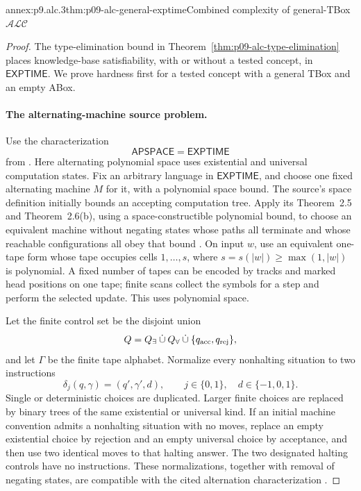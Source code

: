 \begin{annexitem}{annex:p9.alc.3}{thm:p09-alc-general-exptime}{Combined complexity of general-TBox \(\mathcal{ALC}\)}
\begin{proof}
The type-elimination bound in Theorem~\ref{thm:p09-alc-type-elimination}
places knowledge-base satisfiability, with or without a tested concept,
in \(\mathsf{EXPTIME}\).
We prove hardness first for a tested concept with a general TBox and
an empty ABox.

\paragraph{The alternating-machine source problem.}
Use the characterization
\[
 \mathsf{APSPACE}=\mathsf{EXPTIME}
\]
from \cite[Corollary~3.6, p.~122]{ChandraKozenStockmeyer1981}.
Here alternating polynomial space uses existential and universal
computation states.
Fix an arbitrary language in \(\mathsf{EXPTIME}\), and choose one
fixed alternating machine \(M\) for it, with a polynomial space bound.
The source's space definition initially bounds an accepting computation
tree.  Apply its Theorem~2.5 and Theorem~2.6(b), using a
space-constructible polynomial bound, to choose an equivalent machine
without negating states whose paths all terminate and whose reachable
configurations all obey that bound
\cite[pp.~120--122]{ChandraKozenStockmeyer1981}.
On input \(w\), use an equivalent one-tape form whose tape occupies
cells \(1,\ldots,s\), where \(s=s(|w|)\geq\max(1,|w|)\) is polynomial.
A fixed number of tapes can be encoded by tracks and marked head
positions on one tape; finite scans collect the symbols for a step
and perform the selected update.  This uses polynomial space.

Let the finite control set be the disjoint union
\[
 Q=Q_\exists\mathbin{\dot\cup}Q_\forall
                   \mathbin{\dot\cup}\{q_{\rm acc},q_{\rm rej}\},
\]
and let \(\Gamma\) be the finite tape alphabet.
Normalize every nonhalting situation to two instructions
\[
 \delta_j(q,\gamma)=(q',\gamma',d),
 \qquad j\in\{0,1\},\quad d\in\{-1,0,1\}.
\]
Single or deterministic choices are duplicated.  Larger finite
choices are replaced by binary trees of the same existential or
universal kind.
If an initial machine convention admits a nonhalting situation with
no moves, replace an empty existential choice by rejection and an
empty universal choice by acceptance, and then use two identical
moves to that halting answer.
The two designated halting controls have no instructions.
These normalizations, together with removal of negating states,
are compatible with the cited alternation characterization
\cite[\S2]{ChandraKozenStockmeyer1981}.


\end{proof}
\end{annexitem}

